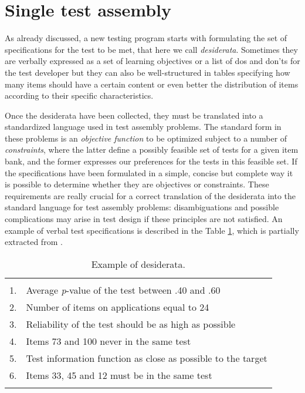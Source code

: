 
\section{Single test assembly}\label{sec:single-test-assembly}

As already discussed, a new testing program starts with formulating the set of specifications for the test to be met, that here we call \emph{desiderata}. Sometimes they are verbally expressed as a set of learning objectives or a list of dos and don'ts for the test developer but they can also be well-structured in tables specifying how many items should have a certain content or even better the distribution of items according to their specific characteristics.

Once the desiderata have been collected, they must be translated into a standardized language used in test assembly problems. The standard form in these problems is an \textit{objective function} to be optimized subject to a number of \textit{constraints}, where the latter define a possibly feasible set of tests for a given item bank, and the former expresses our preferences for the tests in this feasible set. If the specifications have been formulated in a simple, concise but complete way it is possible to determine whether they are objectives or constraints. These requirements are really crucial for a correct translation of the desiderata into the standard language for test assembly problems: disambiguations and possible complications may arise in test design if these principles are not satisfied. An example of verbal test specifications is described in the Table \ref{tab:exspec}, which is partially extracted from \cite{VanDerLinden2005}.

\begin{table}
	\centering
	\begin{tabular}{|ll|}
		\hline & \\
		1. & Average \textit{p}-value of the test between .40 and .60  \\
		2. & Number of items on applications equal to 24  \\
		3. & Reliability of the test should be as high as possible \\
		4. & Items 73 and 100 never in the same test \\
		5. & Test information function as close as possible to the target  \\
		6. & Items 33, 45 and 12 must be in the same test  \\
		&  \\
		\hline
	\end{tabular}
	\caption{Example of desiderata.}\label{tab:exspec}
\end{table}

